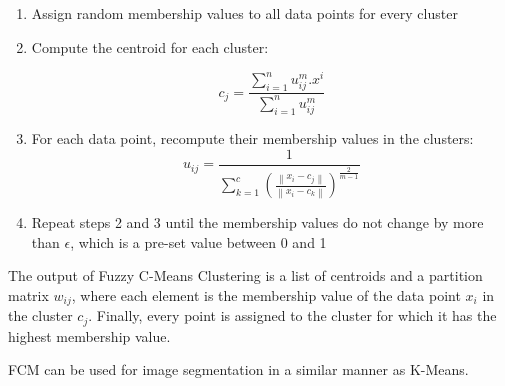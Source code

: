 \begin{enumerate}
  \item Assign random membership values to all data points for every cluster
  \item Compute the centroid for each cluster:
  
  \begin{equation}
    \label{eq:centroid-cmeans}
    c_{j} = \frac{\sum_{i=1}^{n}u_{ij}^{m} . x^{i}}{\sum_{i=1}^{n}u_{ij}^{m}}
    \end{equation}
    
   \item For each data point, recompute their membership values in the clusters:
   \begin{equation}
    \label{eq:update-cmeans}
    u_{ij} = \frac{1}{\sum_{k=1}^{c}\left ( \frac{\left \| x_i - c_j \right \|}{\left \| x_i - c_k \right \|} \right )^{\frac{2}{m-1}}}
    \end{equation}
    
    \item Repeat steps 2 and 3 until the membership values do not change by more than $\epsilon$, which is a pre-set value between 0 and 1
\end{enumerate}

The output of Fuzzy C-Means Clustering is a list of centroids and a partition matrix \textit{$w_{ij}$}, where each element is the membership value of the data point \textit{$x_i$} in the cluster \textit{$c_j$}. Finally, every point is assigned to the cluster for which it has the highest membership value.

FCM can be used for image segmentation in a similar manner as K-Means. 

